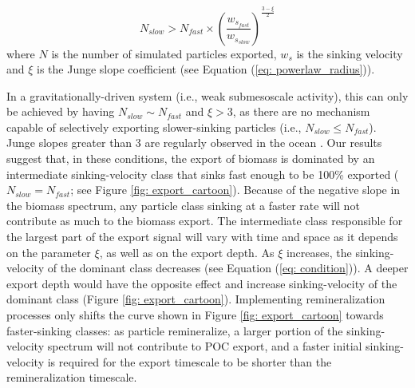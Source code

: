 \documentclass[draft,linenumbers]{agujournal2018}
\begin{document}
\begin{equation}
    N_{slow} > N_{fast} \times \left(\frac{w_{s_{fast}}}{w_{s_{slow}}}\right)^{\frac{3 - \xi}{2}}
    \label{eq: condition}
\end{equation}
where $N$ is the number of simulated particles exported, $w_s$ is the sinking velocity and $\xi$ is the Junge slope coefficient (see Equation (\ref{eq: powerlaw_radius})).

In a gravitationally-driven system (i.e., weak submesoscale activity), this can only be achieved by having  $N_{slow} \sim N_{fast}$ and $\xi>3$, as there are no mechanism capable of selectively exporting slower-sinking particles (i.e., $N_{slow} \leq N_{fast}$). Junge slopes greater than 3 are regularly observed in the ocean \citep{Kostadinov_2009, White_2015}. Our results suggest that, in these conditions, the export of biomass is dominated by an intermediate sinking-velocity class that sinks fast enough to be 100\% exported ($N_{slow} = N_{fast}$; see Figure \ref{fig: export_cartoon}). Because of the negative slope in the biomass spectrum, any particle class sinking at a faster rate will not contribute as much to the biomass export. The intermediate class responsible for the largest part of the export signal will vary with time and space as it depends on the parameter $\xi$, as well as on the export depth. As $\xi$ increases, the sinking-velocity of the dominant class decreases (see Equation (\ref{eq: condition})). A deeper export depth would have the opposite effect and increase sinking-velocity of the dominant class (Figure \ref{fig: export_cartoon}). Implementing remineralization processes only shifts the curve shown in Figure \ref{fig: export_cartoon} towards faster-sinking classes: as particle remineralize, a larger portion of the sinking-velocity spectrum will not contribute to POC export, and a faster initial sinking-velocity is required for the export timescale to be shorter than the remineralization timescale.
\end{document}
